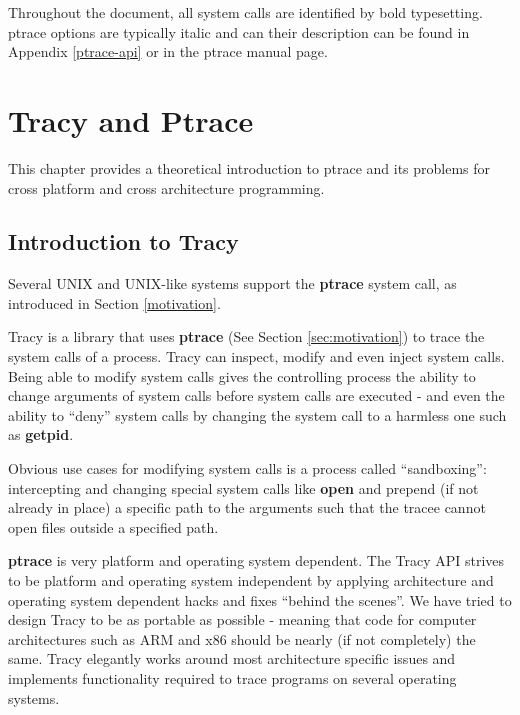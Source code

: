\documentclass[a4paper, 10pt]{report}
\begin{document}
Throughout the document, all system calls are identified by bold typesetting.
ptrace options are typically italic and can their description can be found in
Appendix \ref{ptrace-api} or in the ptrace manual page.

\chapter{Tracy and Ptrace}

This chapter provides a theoretical introduction to ptrace and its problems for
cross platform and cross architecture programming.

\section{Introduction to Tracy}

Several UNIX and UNIX-like systems support the \textbf{ptrace} system call, as
introduced in Section \ref{motivation}.


Tracy is a library that uses \textbf{ptrace} (See Section \ref{sec:motivation})
to trace the system calls of a process. Tracy can inspect, modify and even
inject system calls. Being able to modify system calls gives the controlling
process the ability to change arguments of system calls before system calls
are executed - and even the ability to ``deny'' system calls by changing the
system call to a harmless one such as \textbf{getpid}.

Obvious use cases for modifying system calls is a process
called ``sandboxing'': intercepting and changing special system calls like
\textbf{open} and prepend (if not already in place) a specific path to the
arguments such that the tracee cannot open files outside a specified path.

\textbf{ptrace} is very platform and operating system dependent.
The Tracy API strives to be platform and operating system independent by
applying architecture and operating system dependent hacks and fixes
``behind the scenes''. We have tried to design Tracy to be as portable as
possible - meaning that code for computer architectures such as ARM and
x86 should be nearly (if not completely) the same.
Tracy elegantly works around most architecture specific issues and implements
functionality required to trace programs on several operating systems.
\end{document}
